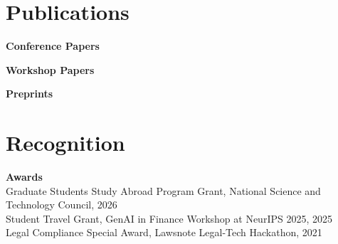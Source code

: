 \documentclass{article}
\begin{document}
\section{Publications}
\vspace{\baselineskip}
\noindent\textbf{Conference Papers}\\
\begin{verse}
\end{verse}
\begin{verse}
\end{verse}
\begin{verse}
\end{verse}
\begin{verse}
\end{verse}
\begin{verse}
\end{verse}
\begin{verse}
\end{verse}
\begin{verse}
\end{verse}
\vspace{\baselineskip}
\noindent\textbf{Workshop Papers}\\
\begin{verse}
\end{verse}
\begin{verse}
\end{verse}
\begin{verse}
\end{verse}
\begin{verse}
\end{verse}
\begin{verse}
\end{verse}
\vspace{\baselineskip}
\noindent\textbf{Preprints}\\
\begin{verse}
\end{verse}
\vspace{1em}
\section{Recognition}
\noindent\textbf{Awards}\\
Graduate Students Study Abroad Program Grant, National Science and Technology Council, 2026\\
Student Travel Grant, GenAI in Finance Workshop at NeurIPS 2025, 2025\\
Legal Compliance Special Award, Lawsnote Legal-Tech Hackathon, 2021\\
\end{document}
